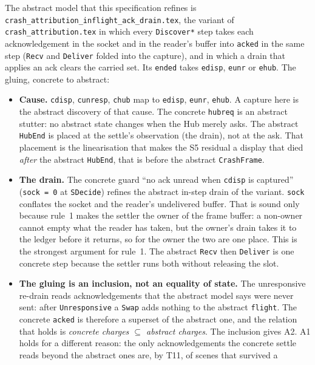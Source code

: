 \documentclass[a4paper,10pt,fleqn]{article}
\begin{document}
The abstract model that this specification refines is
\texttt{crash\_attribution\_inflight\_ack\_drain.tex}, the variant of
\texttt{crash\_attribution.tex} in which every \texttt{Discover*} step takes each
acknowledgement in the socket and in the reader's buffer into \texttt{acked} in
the same step (\texttt{Recv} and \texttt{Deliver} folded into the capture), and
in which a drain that applies an ack clears the carried set.  Its \texttt{ended}
takes \texttt{edisp}, \texttt{eunr} or \texttt{ehub}.  The gluing, concrete to
abstract:

\begin{itemize}
  \item \textbf{Cause.}  \texttt{cdisp}, \texttt{cunresp}, \texttt{chub} map to
    \texttt{edisp}, \texttt{eunr}, \texttt{ehub}.  A capture here is the abstract
    discovery of that cause.  The concrete \texttt{hubreq} is an abstract
    stutter: no abstract state changes when the Hub merely asks.  The abstract
    \texttt{HubEnd} is placed at the settle's observation (the drain), not at the
    ask.  That placement is the linearisation that makes the S5 residual a
    display that died \emph{after} the abstract \texttt{HubEnd}, that is before
    the abstract \texttt{CrashFrame}.
  \item \textbf{The drain.}  The concrete guard ``no ack unread when
    \texttt{cdisp} is captured'' (\texttt{sock = 0} at \texttt{SDecide}) refines
    the abstract in-step drain of the variant.  \texttt{sock} conflates the socket
    and the reader's undelivered buffer.  That is sound only because rule~1 makes
    the settler the owner of the frame buffer: a non-owner cannot empty what the
    reader has taken, but the owner's drain takes it to the ledger before it
    returns, so for the owner the two are one place.  This is the strongest
    argument for rule~1.  The abstract \texttt{Recv} then \texttt{Deliver} is one
    concrete step because the settler runs both without releasing the slot.
  \item \textbf{The gluing is an inclusion, not an equality of state.}  The
    unresponsive re-drain reads acknowledgements that the abstract model says
    were never sent: after \texttt{Unresponsive} a \texttt{Swap} adds nothing to
    the abstract \texttt{flight}.  The concrete \texttt{acked} is therefore a
    superset of the abstract one, and the relation that holds is
    \emph{concrete charges $\subseteq$ abstract charges}.  The inclusion gives A2.
    A1 holds for a different reason: the only acknowledgements the concrete
    settle reads beyond the abstract ones are, by T11, of scenes that survived a

\end{itemize}
\end{document}
